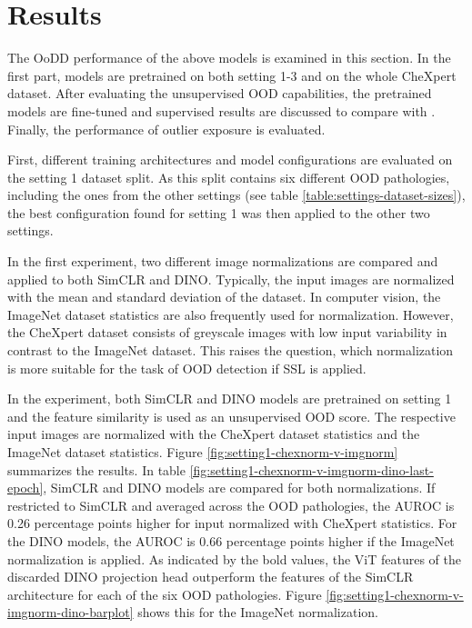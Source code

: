 \section{Results}
\label{section: results}
The OoDD performance of the above models is examined in this section.
In the first part, models are pretrained on both setting 1-3 and on the whole CheXpert dataset.
After evaluating the unsupervised OOD capabilities, the pretrained models are fine-tuned and supervised results are discussed to compare with \citep{Berger2021}.
Finally, the performance of outlier exposure is evaluated.
\par
First, different training architectures and model configurations are evaluated on the setting 1 dataset split.
As this split contains six different OOD pathologies, including the ones from the other settings (see table \ref{table:settings-dataset-sizes}), the best configuration found for setting 1 was then applied to the other two settings.
\par
In the first experiment, two different image normalizations are compared and applied to both SimCLR and DINO.
Typically, the input images are normalized with the mean and standard deviation of the dataset.
In computer vision, the ImageNet dataset statistics \citep{Deng2009} are also frequently used for normalization.
However, the CheXpert dataset consists of greyscale images with low input variability in contrast to the ImageNet dataset.
This raises the question, which normalization is more suitable for the task of OOD detection if SSL is applied.
\par
In the experiment, both SimCLR and DINO models are pretrained on setting 1 and the feature similarity is used as an unsupervised OOD score.
The respective input images are normalized with the CheXpert dataset statistics and the ImageNet dataset statistics.
Figure \ref{fig:setting1-chexnorm-v-imgnorm} summarizes the results.
In table \ref{fig:setting1-chexnorm-v-imgnorm-dino-last-epoch}, SimCLR and DINO models are compared for both normalizations.
If restricted to SimCLR and averaged across the OOD pathologies, the AUROC is 0.26 percentage points higher for input normalized with CheXpert statistics.
For the DINO models, the AUROC is 0.66 percentage points higher if the ImageNet normalization is applied.
As indicated by the bold values, the ViT features of the discarded DINO projection head outperform the features of the SimCLR architecture for each of the six OOD pathologies.
Figure \ref{fig:setting1-chexnorm-v-imgnorm-dino-barplot} shows this for the ImageNet normalization.
